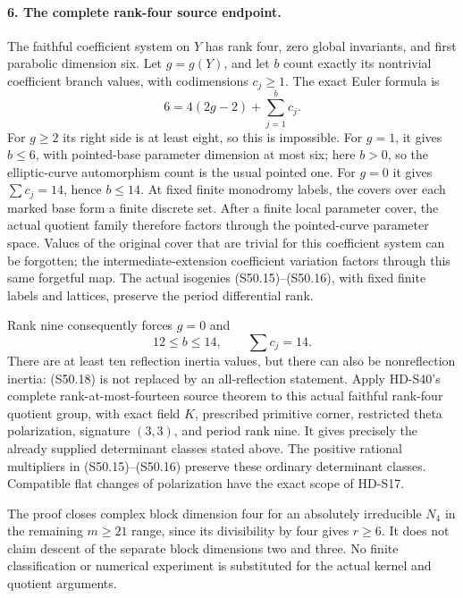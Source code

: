 \paragraph{6. The complete rank-four source endpoint.}
The faithful coefficient system on \(Y\) has rank four,
zero global invariants, and first parabolic dimension six.
Let \(g=g(Y)\), and let \(b\) count exactly its nontrivial
coefficient branch values, with codimensions \(c_j\ge1\).
The exact Euler formula is
\[
                       6=4(2g-2)+\sum_{j=1}^b c_j.
                                                               \tag{S50.17}
\]
For \(g\ge2\) its right side is at least eight, so this
is impossible. For \(g=1\), it gives \(b\le6\), with
pointed-base parameter dimension at most six; here \(b>0\),
so the elliptic-curve automorphism count is the usual pointed
one. For \(g=0\) it gives \(\sum c_j=14\), hence
\(b\le14\). At fixed finite monodromy labels, the covers
over each marked base form a finite discrete set. After a
finite local parameter cover, the actual quotient family
therefore factors through the pointed-curve parameter space.
Values of the original cover that are trivial for this
coefficient system can be forgotten; the intermediate-extension
coefficient variation factors through this same forgetful map.
The actual isogenies (S50.15)--(S50.16), with fixed finite
labels and lattices, preserve the period differential rank.

Rank nine consequently forces \(g=0\) and
\[
                       12\le b\le14,\qquad\sum c_j=14.
                                                               \tag{S50.18}
\]
There are at least ten reflection inertia values, but there
can also be nonreflection inertia: (S50.18) is not replaced
by an all-reflection statement. Apply HD-S40's complete
rank-at-most-fourteen source theorem to this actual faithful
rank-four quotient group, with exact field \(K\), prescribed
primitive corner, restricted theta polarization, signature
\((3,3)\), and period rank nine. It gives precisely the
already supplied determinant classes stated above. The
positive rational multipliers in (S50.15)--(S50.16) preserve
these ordinary determinant classes. Compatible flat changes
of polarization have the exact scope of HD-S17.

The proof closes complex block dimension four for an
absolutely irreducible \(N_4\) in the remaining \(m\ge21\)
range, since its divisibility by four gives \(r\ge6\).
It does not claim descent of the separate block dimensions
two and three. No finite classification or numerical experiment
is substituted for the actual kernel and quotient arguments.
